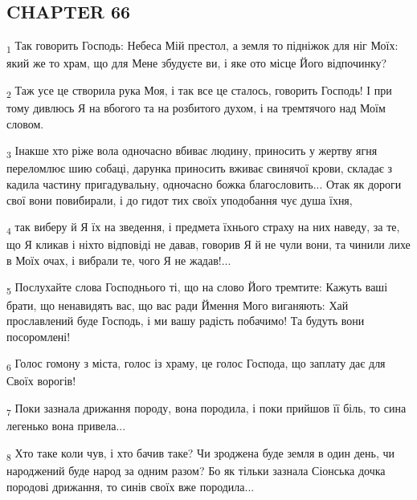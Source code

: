 \subsection{CHAPTER 66}
\begin{tcolorbox}
\textsubscript{1} Так говорить Господь: Небеса Мій престол, а земля то підніжок для ніг Моїх: який же то храм, що для Мене збудуєте ви, і яке ото місце Його відпочинку?
\end{tcolorbox}
\begin{tcolorbox}
\textsubscript{2} Таж усе це створила рука Моя, і так все це сталось, говорить Господь! І при тому дивлюсь Я на вбогого та на розбитого духом, і на тремтячого над Моїм словом.
\end{tcolorbox}
\begin{tcolorbox}
\textsubscript{3} Інакше хто ріже вола одночасно вбиває людину, приносить у жертву ягня переломлює шию собаці, дарунка приносить вживає свинячої крови, складає з кадила частину пригадувальну, одночасно божка благословить... Отак як дороги свої вони повибирали, і до гидот тих своїх уподобання чує душа їхня,
\end{tcolorbox}
\begin{tcolorbox}
\textsubscript{4} так виберу й Я їх на зведення, і предмета їхнього страху на них наведу, за те, що Я кликав і ніхто відповіді не давав, говорив Я й не чули вони, та чинили лихе в Моїх очах, і вибрали те, чого Я не жадав!...
\end{tcolorbox}
\begin{tcolorbox}
\textsubscript{5} Послухайте слова Господнього ті, що на слово Його тремтите: Кажуть ваші брати, що ненавидять вас, що вас ради Ймення Мого виганяють: Хай прославлений буде Господь, і ми вашу радість побачимо! Та будуть вони посоромлені!
\end{tcolorbox}
\begin{tcolorbox}
\textsubscript{6} Голос гомону з міста, голос із храму, це голос Господа, що заплату дає для Своїх ворогів!
\end{tcolorbox}
\begin{tcolorbox}
\textsubscript{7} Поки зазнала дрижання породу, вона породила, і поки прийшов її біль, то сина легенько вона привела...
\end{tcolorbox}
\begin{tcolorbox}
\textsubscript{8} Хто таке коли чув, і хто бачив таке? Чи зроджена буде земля в один день, чи народжений буде народ за одним разом? Бо як тільки зазнала Сіонська дочка породові дрижання, то синів своїх вже породила...
\end{tcolorbox}
